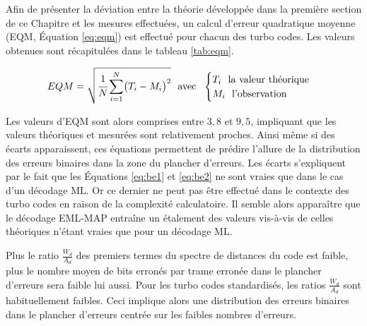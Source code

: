 Afin de présenter la déviation entre la théorie développée dans la première section de ce Chapitre et les mesures 
effectuées, un calcul d'erreur quadratique moyenne (EQM, Équation \ref{eq:eqm}) est effectué pour chacun des turbo codes. 
Les valeurs obtenues sont récapitulées dans le tableau \ref{tab:eqm}.

\begin{equation}
	EQM = \sqrt{\cfrac{1}{N}\sum\limits_{i=1}^N\bigl(T_i-M_i\bigr)^2} \text{~~avec~~} \begin{cases}
		T_i \text{~~la valeur théorique} \\
		M_i \text{~~l'observation}
		\end{cases}
	\label{eq:eqm}
\end{equation}

Les valeurs d'EQM sont alors comprises entre $3,8$ et $9,5$, impliquant que les valeurs théoriques et mesurées sont 
relativement proches. Ainsi même si des écarts apparaissent, ces équations permettent de prédire l'allure de la distribution
des erreurs binaires dans la zone du plancher d'erreurs. Les écarts s'expliquent par le fait que les Équations \ref{eq:be1} 
et \ref{eq:be2} ne sont vraies que dans le cas d'un décodage ML. Or ce dernier ne peut pas être effectué dans le contexte 
des turbo codes en raison de la complexité calculatoire. Il semble alors apparaître que le décodage EML-MAP entraîne un 
étalement des valeurs vis-à-vis de celles théoriques n'étant vraies que pour un décodage ML.

Plus le ratio $\frac{W_d}{A_d}$ des premiers termes du spectre de distances du code est faible, plus le nombre moyen de 
bits erronés par trame erronée dans le plancher d'erreurs sera faible lui aussi. Pour les turbo codes 
standardisés, les ratios $\frac{W_d}{A_d}$ sont habituellement faibles. Ceci implique alors une distribution des erreurs 
binaires dans le plancher d'erreurs centrée sur les faibles nombres d'erreurs.
\begin{table}[t]
\centering
\caption{Erreur quadratique moyenne entre les valeurs théoriques et les simulations Monte-Carlo}
\label{tab:eqm}
\vspace*{-1em}
\end{table}


